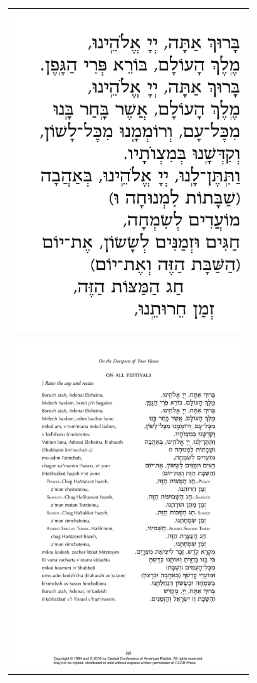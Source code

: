 \documentclass[12pt]{report}
\begin{document}
\newpage
\begin{tabular}{r}
\includegraphics[width=6cm]{figs/0A020-kiddush1}\\
\includegraphics[width=6cm]{figs/0A024-kiddush2}\\
\end{tabular}
\end{document}
